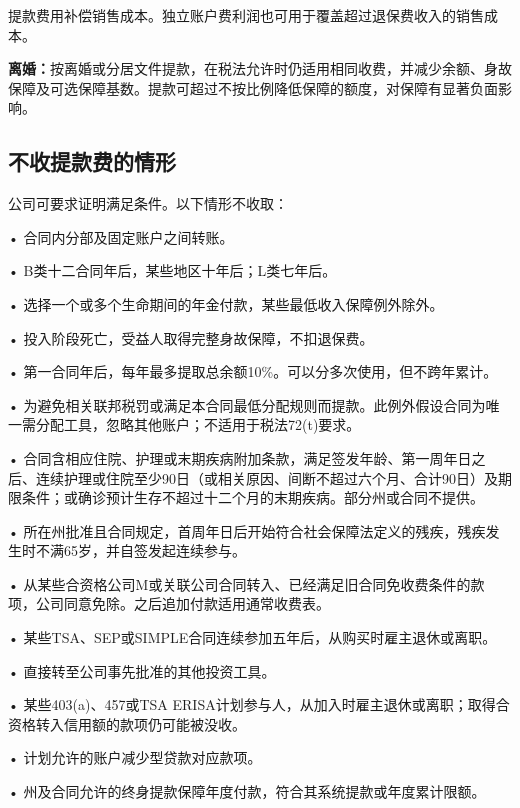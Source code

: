 \documentclass[UTF8,fontset=none,11pt,a4paper]{ctexart}
\begin{document}
提款费用补偿销售成本。独立账户费利润也可用于覆盖超过退保费收入的\allowbreak\mbox{销售成本。}


\textbf{离婚：}按离婚或分居文件提款，在税法允许时仍适用相同收费，并减少余额、身故保障及可选保障基数。提款可超过不按比例降低保障的额度，对保障有显著\allowbreak\mbox{负面影响。}


\subsection*{不收提款费的情形}
公司可要求证明满足条件。以下情\allowbreak\mbox{形不收取：}


• 合同内分部及固定账户\allowbreak\mbox{之间转账。}


• B类十二合同年后，某些地区十年后；L\allowbreak\mbox{类七年后。}


• 选择一个或多个生命期间的年金付款，某些最低收入保障\allowbreak\mbox{例外除外。}


• 投入阶段死亡，受益人取得完整身故保障，不\allowbreak\mbox{扣退保费。}


• 第一合同年后，每年最多提取总余额10\%。可以分多次使用，但不\allowbreak\mbox{跨年累计。}


• 为避免相关联邦税罚或满足本合同最低分配规则而提款。此例外假设合同为唯一需分配工具，忽略其他账户；不适用于税法72(t)要求。


• 合同含相应住院、护理或末期疾病附加条款，满足签发年龄、第一周年日之后、连续护理或住院至少90日（或相关原因、间断不超过六个月、合计90日）及期限条件；或确诊预计生存不超过十二个月的末期疾病。部分州或合\allowbreak\mbox{同不提供。}


• 所在州批准且合同规定，首周年日后开始符合社会保障法定义的残疾，残疾发生时不满65岁，并自签发起\allowbreak\mbox{连续参与。}


• 从某些合资格公司M或关联公司合同转入、已经满足旧合同免收费条件的款项，公司同意免除。之后追加付款适用通\allowbreak\mbox{常收费表。}


• 某些TSA、SEP或SIMPLE合同连续参加五年后，从购买时雇主退\allowbreak\mbox{休或离职。}


• 直接转至公司事先批准的其他\allowbreak\mbox{投资工具。}


• 某些403(a)、457或TSA ERISA计划参与人，从加入时雇主退休或离职；取得合资格转入信用额的款项仍可\allowbreak\mbox{能被没收。}


• 计划允许的账户减少型贷款\allowbreak\mbox{对应款项。}


• 州及合同允许的终身提款保障年度付款，符合其系统提款或年度\allowbreak\mbox{累计限额。}
\end{document}
